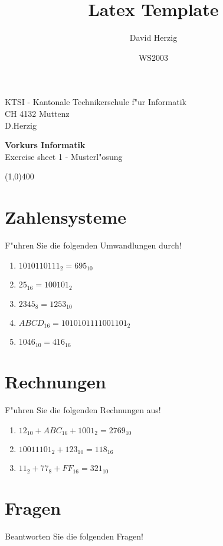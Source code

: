 \documentclass[a4paper,10pt]{article}
\title{Latex Template}
\author{David Herzig}
\date{WS2003}
\begin{document}
KTSI - Kantonale Technikerschule f"ur Informatik\\
CH 4132 Muttenz\\
D.Herzig

\vspace{2mm}

\begin{center}
{\Large \bf Vorkurs Informatik}\\
Exercise sheet 1 - Musterl"osung
\end{center}

\vspace{2mm}

\line(1,0){400}

\vspace{5mm}

\section{Zahlensysteme}

F"uhren Sie die folgenden Umwandlungen durch!

\begin{enumerate}
\item $1010110111_{2} = 695_{10}$
\item $25_{16} = 100101_{2}$
\item $2345_{8} = 1253_{10}$
\item $ABCD_{16} = 1010101111001101_{2}$
\item $1046_{10} = 416_{16}$
\end{enumerate}

\section{Rechnungen}
F"uhren Sie die folgenden Rechnungen aus!

\begin{enumerate}
\item $12_{10} + ABC_{16} + 1001_{2} = 2769_{10}$
\item $10011101_{2} + 123_{10} = 118_{16}$
\item $11_{2} + 77_{8} + FF_{16} = 321_{10}$
\end{enumerate}


\section{Fragen}

Beantworten Sie die folgenden Fragen!
\end{document}
